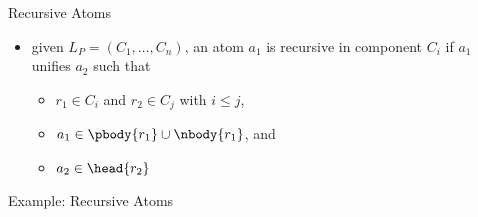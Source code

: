 

\begin{frame}{Recursive Atoms}
  \vfill
  \begin{itemize}
    \item given \(L_P = (C_1, \dots, C_n)\), an atom \(a_1\) is \alert{recursive} in component \(C_i\) if \(a_1\) unifies \(a_2\) such that
      \begin{itemize}
        \item \(r_1 \in C_i\) and \(r_2 \in C_j\) with \(i \leq j\),
        \item \(a_1 \in \pbody{r_1}\cup\nbody{r_1}\), and
        \item \(a_2 \in \head{r_2}\)
      \end{itemize}
  \end{itemize}
\end{frame}

\begin{frame}{Example: Recursive Atoms}
  \vfill
  \begin{center}
    \DepGraph[\alert]
  \end{center}
\end{frame}

